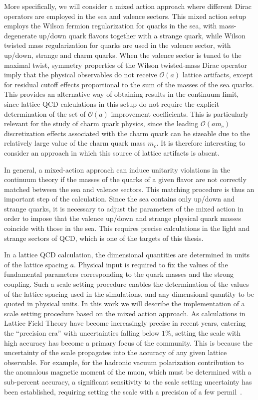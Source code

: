 More specifically, we will consider a mixed action approach where different Dirac operators are employed in the sea and valence sectors. This mixed action setup employs the Wilson fermion regularization for quarks in the sea, with mass-degenerate up/down quark flavors together with a strange quark, while Wilson twisted mass regularization for quarks are used in the valence sector, with up/down, strange and charm quarks. When the valence sector is tuned to the maximal twist, symmetry properties of the Wilson twisted-mass Dirac operator imply that the physical observables do not receive $\mathcal{O}(a)$ lattice artifacts, except for residual cutoff effects proportional to the sum of the masses of the sea quarks.
This provides an alternative way of obtaining results in the continuum limit, since lattice QCD calculations in this setup do not require the explicit determination of the set of $\mathcal{O}(a)$ improvement coefficients. This is particularly relevant for the study of charm quark physics, since the leading $\mathcal{O}(am_c)$ discretization effects associated with the charm quark can be sizeable due to the relatively large value of the charm quark mass $m_c$.  It is therefore interesting to consider an approach in which this source of lattice artifacts is absent.

In general, a mixed-action approach can induce unitarity violations in the continuum theory if the masses of the quarks of a given flavor are not correctly matched between the sea and valence sectors. This matching procedure is thus an important step of the calculation. Since the sea contains only up/down and strange quarks, it is necessary to adjust the parameters of the mixed action in order to impose that the valence up/down and strange physical quark masses coincide with those in the sea. This requires precise calculations in the light and strange sectors of QCD, which is one of the targets of this thesis.

In a lattice QCD calculation, the dimensional quantities are determined in units of the lattice spacing $a$. Physical input is required to fix the values of the fundamental parameters corresponding to the quark masses and the strong coupling. Such a scale setting procedure enables the determination of the values of  the lattice spacing used in the simulations, and any dimensional quantity to be quoted in physical units. In this work we will describe the implementation of a scale setting procedure based on the mixed action approach. As calculations in Lattice Field Theory have become increasingly precise in recent years, entering the ``precision era'' with uncertainties falling below $1\%$, setting the scale with high accuracy has become a primary focus of the community. This is because the uncertainty of the scale propagates into the accuracy of any given lattice observable. For example, for the hadronic  vacuum polarization contribution to the anomalous magnetic moment of the muon, which must be determined with a sub-percent accuracy, a significant sensitivity to the scale setting uncertainty has been established, requiring setting the scale with a precision of a few permil~\citep{DellaMorte:2017dyu}.

